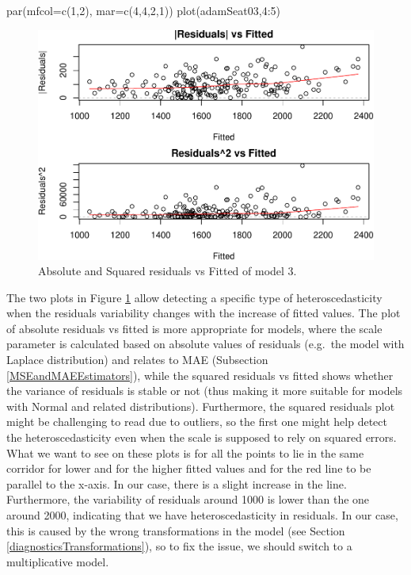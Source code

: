 \documentclass[
]{book}
\newenvironment{Shaded}{\begin{snugshade}}{\end{snugshade}}
\newcommand{\AttributeTok}[1]{\textcolor[rgb]{0.77,0.63,0.00}{#1}}
\newcommand{\DecValTok}[1]{\textcolor[rgb]{0.00,0.00,0.81}{#1}}
\newcommand{\FunctionTok}[1]{\textcolor[rgb]{0.00,0.00,0.00}{#1}}
\newcommand{\NormalTok}[1]{#1}
\newcommand{\SpecialCharTok}[1]{\textcolor[rgb]{0.00,0.00,0.00}{#1}}
\theoremstyle{definition}
\theoremstyle{definition}
\theoremstyle{definition}
\theoremstyle{definition}
\theoremstyle{remark}
\begin{document}
\begin{Shaded}
\begin{Highlighting}[]
\FunctionTok{par}\NormalTok{(}\AttributeTok{mfcol=}\FunctionTok{c}\NormalTok{(}\DecValTok{1}\NormalTok{,}\DecValTok{2}\NormalTok{), }\AttributeTok{mar=}\FunctionTok{c}\NormalTok{(}\DecValTok{4}\NormalTok{,}\DecValTok{4}\NormalTok{,}\DecValTok{2}\NormalTok{,}\DecValTok{1}\NormalTok{))}
\FunctionTok{plot}\NormalTok{(adamSeat03,}\DecValTok{4}\SpecialCharTok{:}\DecValTok{5}\NormalTok{)}
\end{Highlighting}
\end{Shaded}

\begin{figure}
\centering
\includegraphics{Svetunkov--2022----ADAM_files/figure-latex/adamSeat03Hetero-1.pdf}
\caption{\label{fig:adamSeat03Hetero}Absolute and Squared residuals vs Fitted of model 3.}
\end{figure}

The two plots in Figure \ref{fig:adamSeat03Hetero} allow detecting a specific type of heteroscedasticity when the residuals variability changes with the increase of fitted values. The plot of absolute residuals vs fitted is more appropriate for models, where the scale parameter is calculated based on absolute values of residuals (e.g.~the model with Laplace distribution) and relates to MAE (Subsection \ref{MSEandMAEEstimators}), while the squared residuals vs fitted shows whether the variance of residuals is stable or not (thus making it more suitable for models with Normal and related distributions). Furthermore, the squared residuals plot might be challenging to read due to outliers, so the first one might help detect the heteroscedasticity even when the scale is supposed to rely on squared errors. What we want to see on these plots is for all the points to lie in the same corridor for lower and for the higher fitted values and for the red line to be parallel to the x-axis. In our case, there is a slight increase in the line. Furthermore, the variability of residuals around 1000 is lower than the one around 2000, indicating that we have heteroscedasticity in residuals. In our case, this is caused by the wrong transformations in the model (see Section \ref{diagnosticsTransformations}), so to fix the issue, we should switch to a multiplicative model.
\end{document}
